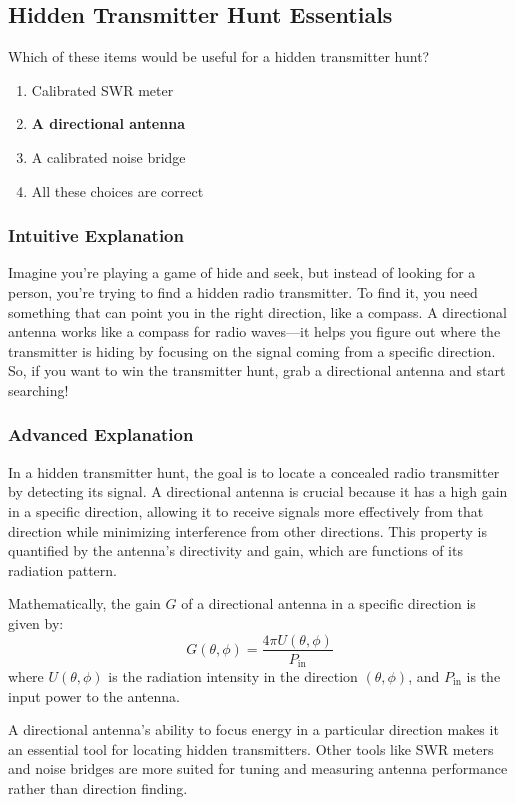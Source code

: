 \subsection{Hidden Transmitter Hunt Essentials}
\label{T8C02}

\begin{tcolorbox}[colback=gray!10!white,colframe=black!75!black,title=T8C02]
Which of these items would be useful for a hidden transmitter hunt?
\begin{enumerate}[label=\Alph*]
    \item Calibrated SWR meter
    \item \textbf{A directional antenna}
    \item A calibrated noise bridge
    \item All these choices are correct
\end{enumerate}
\end{tcolorbox}

\subsubsection{Intuitive Explanation}
Imagine you're playing a game of hide and seek, but instead of looking for a person, you're trying to find a hidden radio transmitter. To find it, you need something that can point you in the right direction, like a compass. A directional antenna works like a compass for radio waves—it helps you figure out where the transmitter is hiding by focusing on the signal coming from a specific direction. So, if you want to win the transmitter hunt, grab a directional antenna and start searching!

\subsubsection{Advanced Explanation}
In a hidden transmitter hunt, the goal is to locate a concealed radio transmitter by detecting its signal. A directional antenna is crucial because it has a high gain in a specific direction, allowing it to receive signals more effectively from that direction while minimizing interference from other directions. This property is quantified by the antenna's directivity and gain, which are functions of its radiation pattern.

Mathematically, the gain \( G \) of a directional antenna in a specific direction is given by:
\[ G(\theta, \phi) = \frac{4\pi U(\theta, \phi)}{P_{\text{in}}} \]
where \( U(\theta, \phi) \) is the radiation intensity in the direction \( (\theta, \phi) \), and \( P_{\text{in}} \) is the input power to the antenna.

A directional antenna's ability to focus energy in a particular direction makes it an essential tool for locating hidden transmitters. Other tools like SWR meters and noise bridges are more suited for tuning and measuring antenna performance rather than direction finding.

